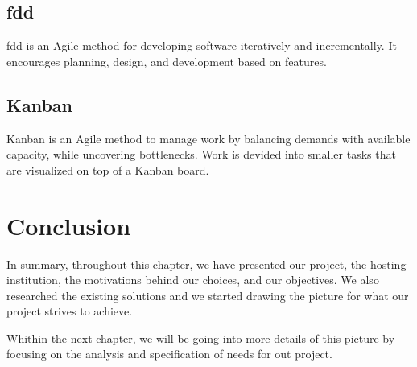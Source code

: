 \subsection{\acrlong{fdd}}

\acrfull{fdd} is an Agile method for developing software iteratively and incrementally. It encourages planning, design, and development based on features.

\subsection{Kanban}

Kanban is an Agile method to manage work by balancing demands with available capacity, while uncovering bottlenecks.
Work is devided into smaller tasks that are visualized on top of a Kanban board.

\section{Conclusion}

In summary, throughout this chapter, we have presented our project, the hosting institution, the motivations behind our choices, and our objectives. We also researched the existing solutions and we started drawing the picture for what our project strives to achieve.

Whithin the next chapter, we will be going into more details of this picture by focusing on the analysis and specification of needs for out project.